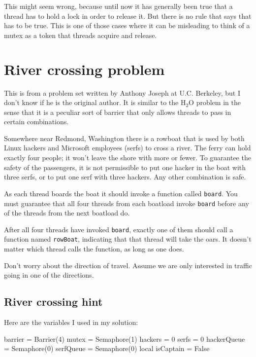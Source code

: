 \documentclass{book}
\begin{document}
This might seem wrong, because until now it
has generally been true that a thread has to hold a lock in
order to release it.  But there is no rule that says that has
to be true.  This is one of those cases where it can be misleading
to think of a mutex as a token that threads acquire and release.


\section {River crossing problem}

This is from a problem set written by Anthony Joseph
at U.C. Berkeley, but I don't know if he is the original author.
It is similar to the H$_2$O problem in the sense that it is
a peculiar sort of barrier that only allows threads to pass
in certain combinations.

Somewhere near Redmond, Washington there is a rowboat that is used by
both Linux hackers and Microsoft employees (serfs) to cross a river.  The
ferry can hold exactly four people; it won't leave the shore with more
or fewer.  To guarantee the safety of the passengers, it is not
permissible to put one hacker in the boat with three serfs, or to
put one serf with three hackers.  Any other combination is safe.

As each thread boards the boat it should invoke a function
called {\tt board}.  You must guarantee that all four threads
from each boatload invoke {\tt board} before any of the threads
from the next boatload do.

After all four threads have invoked {\tt board}, exactly one of
them should call a function named {\tt rowBoat}, indicating
that that thread will take the oars.  It doesn't matter which thread
calls the function, as long as one does.

Don't worry about the direction of travel.  Assume we are
only interested in traffic going in one of the directions.



\subsection {River crossing hint}

Here are the variables I used in my solution:

\begin{unbreakable}[title={River crossing hint}]{}
barrier = Barrier(4)
mutex = Semaphore(1)
hackers = 0
serfs = 0
hackerQueue = Semaphore(0)
serfQueue = Semaphore(0)
local isCaptain = False
\end{unbreakable}
\end{document}
